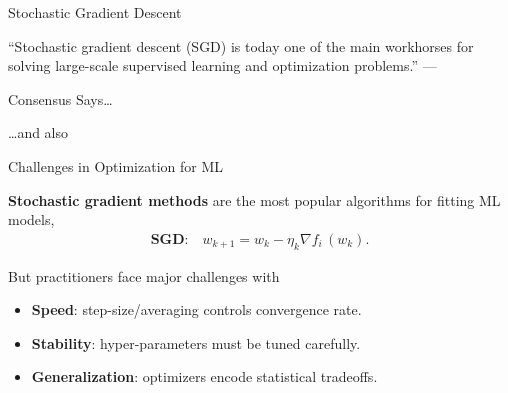 \documentclass[mathserif,notheorems, hyperref={colorlinks, citecolor=blue, urlcolor=blue, linkcolor=blue}]{beamer}
\def\\{}%
\begin{document}

\begin{frame}{Stochastic Gradient Descent}

	\begin{center}
		\Large
		``Stochastic gradient descent (SGD) is today one of the main workhorses for solving large-scale supervised learning and optimization problems.''\\
		---\citet{drori2019complexity}
	\end{center}

\end{frame}

\begin{frame}{Consensus Says\ldots}

	\begin{center}
		\Large \dots and also~\citet{xu2017second,
			zhang2016parallel,
			patterson2017deep,
			pillaud2018statistical,
			grosse2015scaling,
			assran2018stochastic,
			damaskinos2019aggregathor,
			kawaguchi2020ordered,
			bernstein2018signsgd,
			li2019rsa,
			agarwal2017second,
			hofmann2015variance,
			geffner2019rule,
			assran2020convergence,
			gower2019sgd}
	\end{center}

\end{frame}

\begin{frame}{Challenges in Optimization for ML}

	\textbf{Stochastic gradient methods} are the most popular algorithms for fitting ML models,
	\begin{align*}
		\textbf{SGD:} \quad w_{k + 1} = w_k - \eta_k \nabla f_i \, (w_k). \\
	\end{align*}


	But practitioners face major challenges with \vspace{0.5em}
	\begin{itemize}
		\item \textbf{Speed}: step-size/averaging controls convergence rate.
		\item \textbf{Stability}: hyper-parameters must be tuned carefully.
		\item \textbf{Generalization}: optimizers encode statistical tradeoffs.
	\end{itemize}
	\vspace{1em}

\end{frame}
\end{document}
